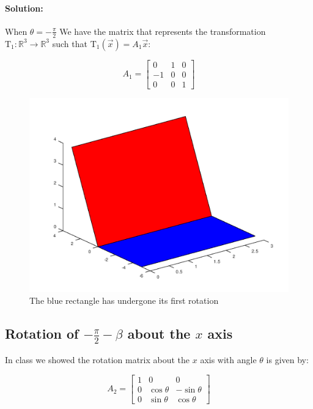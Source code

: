 \documentclass[12pt, letterpaper]{article}
\newcommand{\R}{\mathbb{R}}
\theoremstyle{statement}
\theoremstyle{statement}
\newenvironment{Solution}{\noindent\ignorespaces\paragraph{Solution:}}{\hfill \ding{122}\par\noindent}
\begin{document}
\begin{Solution}
    When $\theta=-\frac{\pi}{2}$ We have the matrix that represents the transformation $\operatorname{T_1}:\R^3\longrightarrow\R^3$ such that $\operatorname{T_1}(\Vec{x})=A_1\Vec{x}$:
    
    $$
    A_1=
    \begin{bmatrix}
    0 & 1 & 0 \\
    -1 & 0 & 0 \\
    0 & 0 & 1
    \end{bmatrix}
    $$
    
    \begin{figure}[H]
        \centering
        \includegraphics[scale=0.5]{box4.png}
        \caption{The blue rectangle has undergone its first rotation}
        \label{fig:fig4}
    \end{figure}
    
    \end{Solution}
    
    \subsection*{Rotation of $-\frac{\pi}{2}-\beta$ about the $x$ axis}
    In class we showed the rotation matrix about the $x$ axis with angle $\theta$ is given by:
    
    $$
    A_2=
    \begin{bmatrix}
    1 & 0 & 0\\
    0 & \cos{\theta} & -\sin{\theta} \\
    0 & \sin{\theta} & \cos{\theta}  
    \end{bmatrix}
    $$
    
\end{document}

